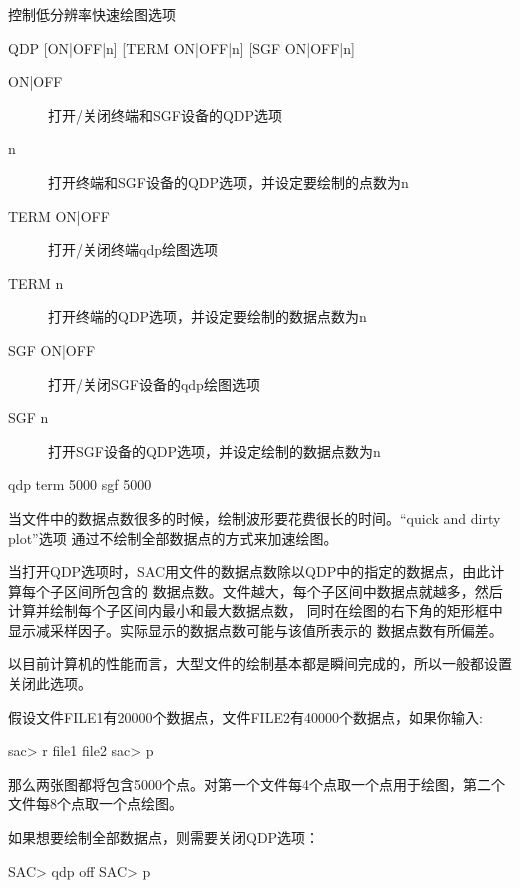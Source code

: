 \label{cmd:qdp}

控制低分辨率快速绘图选项

\begin{SACSTX}
QDP [ON|OFF|n] [TERM ON|OFF|n] [SGF ON|OFF|n]
\end{SACSTX}

\begin{description}
\item [ON|OFF] 打开/关闭终端和SGF设备的QDP选项
\item [n] 打开终端和SGF设备的QDP选项，并设定要绘制的点数为n
\item [TERM ON|OFF] 打开/关闭终端qdp绘图选项
\item [TERM n] 打开终端的QDP选项，并设定要绘制的数据点数为n
\item [SGF ON|OFF] 打开/关闭SGF设备的qdp绘图选项
\item [SGF n] 打开SGF设备的QDP选项，并设定绘制的数据点数为n
\end{description}

\begin{SACDFT}
qdp term 5000 sgf 5000
\end{SACDFT}

当文件中的数据点数很多的时候，绘制波形要花费很长的时间。``quick and dirty plot''选项
通过不绘制全部数据点的方式来加速绘图。

当打开QDP选项时，SAC用文件的数据点数除以QDP中的指定的数据点，由此计算每个子区间所包含的
数据点数。文件越大，每个子区间中数据点就越多，然后计算并绘制每个子区间内最小和最大数据点数，
同时在绘图的右下角的矩形框中显示减采样因子。实际显示的数据点数可能与该值所表示的
数据点数有所偏差。

以目前计算机的性能而言，大型文件的绘制基本都是瞬间完成的，所以一般都设置关闭此选项。

假设文件FILE1有20000个数据点，文件FILE2有40000个数据点，如果你输入:
\begin{SACCode}
sac> r file1 file2
sac> p
\end{SACCode}
那么两张图都将包含5000个点。对第一个文件每4个点取一个点用于绘图，第二个文件每8个点取一个点绘图。

如果想要绘制全部数据点，则需要关闭QDP选项：
\begin{SACCode}
SAC> qdp off
SAC> p
\end{SACCode}

